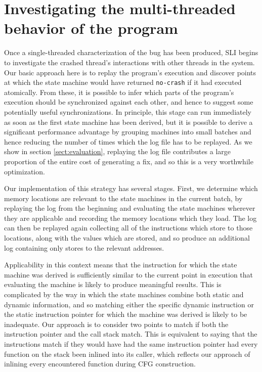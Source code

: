 \documentclass[10pt,twocolumn,preprint,natbib,authoryear]{sigplanconf}
\begin{document}
\section{Investigating the multi-threaded behavior of the program}
\label{sect:multi_threading}

Once a single-threaded characterization of the bug has been produced,
SLI begins to investigate the crashed thread's interactions with other
threads in the system.  Our basic approach here is to replay the
program's execution and discover points at which the state machine
would have returned \verb|no-crash| if it had executed atomically.
From these, it is possible to infer which parts of the program's
execution should be synchronized against each other, and hence to
suggest some potentially useful synchronizations.  In principle, this
stage can run immediately as soon as the first state machine has been
derived, but it is possible to derive a significant performance
advantage by grouping machines into small batches and hence reducing
the number of times which the log file has to be replayed.  As we show
in section \ref{sect:evaluation}, replaying the log file contributes a
large proportion of the entire cost of generating a fix, and so this
is a very worthwhile optimization.

Our implementation of this strategy has several stages.  First, we
determine which memory locations are relevant to the state machines in
the current batch, by replaying the log from the beginning and
evaluating the state machines wherever they are applicable and
recording the memory locations which they load.  The log can then be
replayed again collecting all of the instructions which store to those
locations, along with the values which are stored, and so produce an
additional log containing only stores to the relevant addresses.

Applicability in this context means that the instruction for which the
state machine was derived is sufficiently similar to the current point
in execution that evaluating the machine is likely to produce
meaningful results.  This is complicated by the way in which the state
machines combine both static and dynamic information, and so matching
either the specific dynamic instruction or the static instruction
pointer for which the machine was derived is likely to be inadequate.
Our approach is to consider two points to match if both the
instruction pointer and the call stack match.  This is equivalent to
saying that the instructions match if they would have had the same
instruction pointer had every function on the stack been inlined into
its caller, which reflects our approach of inlining every encountered
function during CFG construction.
\end{document}
